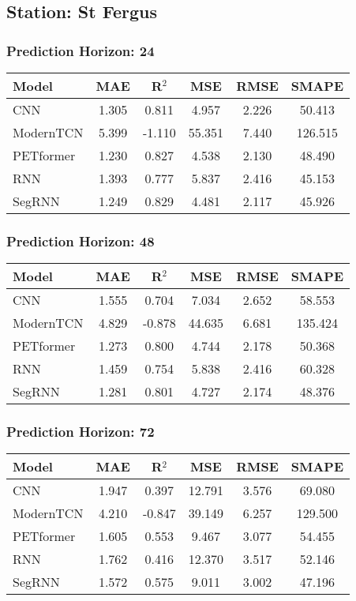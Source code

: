 \subsection*{Station: St Fergus}
\subsubsection*{Prediction Horizon: 24}
\begin{tabular}{lccccc}
\toprule
Model & MAE & R$^2$ & MSE & RMSE & SMAPE \\
\midrule
CNN & 1.305 & 0.811 & 4.957 & 2.226 & 50.413 \\
ModernTCN & 5.399 & -1.110 & 55.351 & 7.440 & 126.515 \\
PETformer & 1.230 & 0.827 & 4.538 & 2.130 & 48.490 \\
RNN & 1.393 & 0.777 & 5.837 & 2.416 & 45.153 \\
SegRNN & 1.249 & 0.829 & 4.481 & 2.117 & 45.926 \\
\bottomrule
\end{tabular}
\vspace{0.5cm}
\subsubsection*{Prediction Horizon: 48}
\begin{tabular}{lccccc}
\toprule
Model & MAE & R$^2$ & MSE & RMSE & SMAPE \\
\midrule
CNN & 1.555 & 0.704 & 7.034 & 2.652 & 58.553 \\
ModernTCN & 4.829 & -0.878 & 44.635 & 6.681 & 135.424 \\
PETformer & 1.273 & 0.800 & 4.744 & 2.178 & 50.368 \\
RNN & 1.459 & 0.754 & 5.838 & 2.416 & 60.328 \\
SegRNN & 1.281 & 0.801 & 4.727 & 2.174 & 48.376 \\
\bottomrule
\end{tabular}
\vspace{0.5cm}
\subsubsection*{Prediction Horizon: 72}
\begin{tabular}{lccccc}
\toprule
Model & MAE & R$^2$ & MSE & RMSE & SMAPE \\
\midrule
CNN & 1.947 & 0.397 & 12.791 & 3.576 & 69.080 \\
ModernTCN & 4.210 & -0.847 & 39.149 & 6.257 & 129.500 \\
PETformer & 1.605 & 0.553 & 9.467 & 3.077 & 54.455 \\
RNN & 1.762 & 0.416 & 12.370 & 3.517 & 52.146 \\
SegRNN & 1.572 & 0.575 & 9.011 & 3.002 & 47.196 \\
\bottomrule
\end{tabular}
\vspace{0.5cm}
